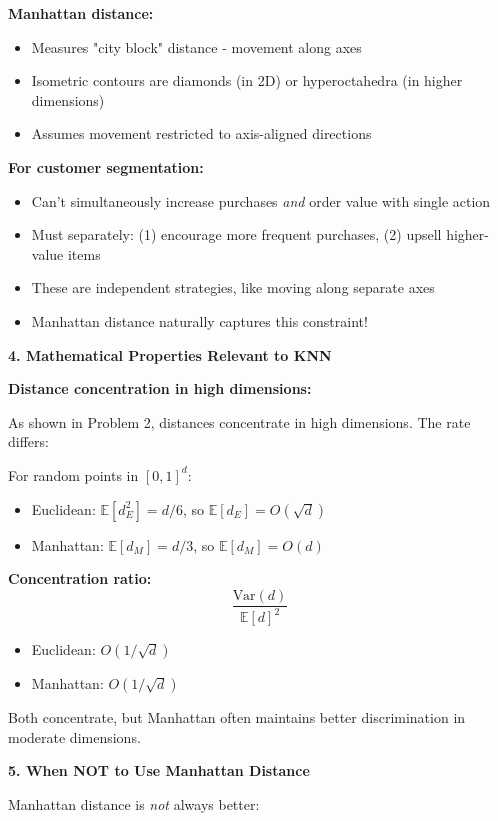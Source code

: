 \documentclass[12pt]{article}
\begin{document}
\begin{explanation}
\textbf{Manhattan distance:}
\begin{itemize}
    \item Measures "city block" distance - movement along axes
    \item Isometric contours are diamonds (in 2D) or hyperoctahedra (in higher dimensions)
    \item Assumes movement restricted to axis-aligned directions
\end{itemize}

\textbf{For customer segmentation:}
\begin{itemize}
    \item Can't simultaneously increase purchases \textit{and} order value with single action
    \item Must separately: (1) encourage more frequent purchases, (2) upsell higher-value items
    \item These are independent strategies, like moving along separate axes
    \item Manhattan distance naturally captures this constraint!
\end{itemize}

\textbf{4. Mathematical Properties Relevant to KNN}

\textbf{Distance concentration in high dimensions:}

As shown in Problem 2, distances concentrate in high dimensions. The rate differs:

For random points in \([0,1]^d\):
\begin{itemize}
    \item Euclidean: \(\mathbb{E}[d_E^2] = d/6\), so \(\mathbb{E}[d_E] = O(\sqrt{d})\)
    \item Manhattan: \(\mathbb{E}[d_M] = d/3\), so \(\mathbb{E}[d_M] = O(d)\)
\end{itemize}

\textbf{Concentration ratio:}
\[
\frac{\text{Var}(d)}{\mathbb{E}[d]^2}
\]

\begin{itemize}
    \item Euclidean: \(O(1/\sqrt{d})\)
    \item Manhattan: \(O(1/\sqrt{d})\)
\end{itemize}

Both concentrate, but Manhattan often maintains better discrimination in moderate dimensions.

\textbf{5. When NOT to Use Manhattan Distance}

Manhattan distance is \textit{not} always better:


\end{explanation}
\end{document}
